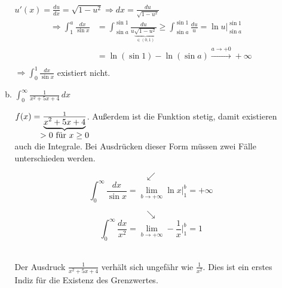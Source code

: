 \documentclass{article}
\begin{document}
\begin{enumerate}[1.]
\begin{enumerate}[a)]
    $u'(x) = \frac{du}{dx} = \sqrt{1 - u^2} \Rightarrow dx = \frac{du}{\sqrt{1 - u^2}}$
    \begin{align*}
      \Rightarrow \int_1^a \frac{dx}{\sin x} &= \int_{\sin a}^{\sin 1}
                                               \frac{du}{u \underset{\in (0, 1)}{\underbrace{\sqrt{1 - u^2}}}}
                                               \geq \int_{\sin a}^{\sin 1} \frac{du}{u}
                                               = \ln u {\Big |}_{\sin a}^{\sin 1}\\
                                             &= \ln(\sin 1) - \ln(\sin a)
                                               \overset{a \to +0}\longrightarrow +\infty \\
    \end{align*}
    $\Rightarrow \int_0^1 \frac{dx}{\sin x}$ existiert nicht.

  \newpage
  \label{sec:1c}  
  \item $\int_0^{\infty} \frac{1}{x^2 + 5x + 4} \,dx$

    $f(x) = \frac{1}{\underset{\makebox[0pt]{$> 0$ für $x \geq 0$}}{\underbrace{x^2 + 5x + 4}}}$.
    Außerdem ist die Funktion stetig, damit existieren auch die Integrale.
    Bei Ausdrücken dieser Form müssen zwei Fälle unterschieden werden.
    
    \begin{minipage}[t]{.4\textwidth}
      \[ \swarrow \]
      \[
        \int_0^{\infty} \frac{dx}{\sin x} = \lim_{b \to +\infty} \ln x {\Big |}_1^b = +\infty
      \]
    \end{minipage}
    \hfill
    \begin{minipage}[t]{.4\textwidth}
      \[ \searrow \]
      \[
        \int_0^{\infty} \frac{dx}{x^2} = \lim_{b \to +\infty} -\frac{1}{x} {\Big |}_1^b = 1
      \]
    \end{minipage} \\

    Der Ausdruck $\frac{1}{x^2 + 5x + 4}$ verhält sich ungefähr wie $\frac{1}{x^2}$.
    Dies ist ein erstes Indiz für die Existenz des Grenzwertes.


\end{enumerate}
\end{enumerate}
\end{document}
